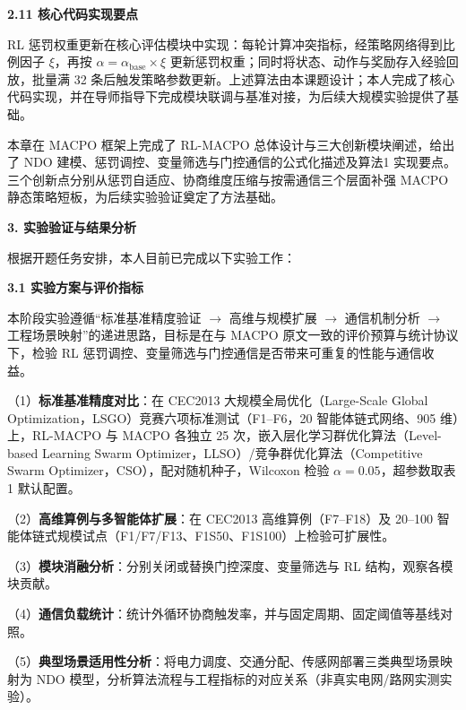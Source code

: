 \par
\indent
\textbf{2.11 核心代码实现要点}
\par
RL 惩罚权重更新在核心评估模块中实现：每轮计算冲突指标，经策略网络得到比例因子 $\xi$，再按 $\alpha=\alpha_{\mathrm{base}}\times\xi$ 更新惩罚权重；同时将状态、动作与奖励存入经验回放，批量满 32 条后触发策略参数更新。上述算法由本课题设计；本人完成了核心代码实现，并在导师指导下完成模块联调与基准对接，为后续大规模实验提供了基础。

\par

本章在 MACPO 框架上完成了 RL-MACPO 总体设计与三大创新模块阐述，给出了 NDO 建模、惩罚调控、变量筛选与门控通信的公式化描述及算法1 实现要点。三个创新点分别从惩罚自适应、协商维度压缩与按需通信三个层面补强 MACPO 静态策略短板，为后续实验验证奠定了方法基础。

\par
\indent
\noindent\textbf{3. 实验验证与结果分析}

\par
\indent
根据开题任务安排，本人目前已完成以下实验工作：

\par
\indent
\textbf{3.1 实验方案与评价指标}
\par
本阶段实验遵循“标准基准精度验证 $\rightarrow$ 高维与规模扩展 $\rightarrow$ 通信机制分析 $\rightarrow$ 工程场景映射”的递进思路，目标是在与 MACPO 原文一致的评价预算与统计协议下，检验 RL 惩罚调控、变量筛选与门控通信是否带来可重复的性能与通信收益。

\par
\indent
（1）\textbf{标准基准精度对比}：在 CEC2013 大规模全局优化（Large-Scale Global Optimization，LSGO）竞赛六项标准测试（F1--F6，20 智能体链式网络、905 维）上，RL-MACPO 与 MACPO 各独立 25 次，嵌入层化学习群优化算法（Level-based Learning Swarm Optimizer，LLSO）/竞争群优化算法（Competitive Swarm Optimizer，CSO），配对随机种子，Wilcoxon 检验 $\alpha{=}0.05$，超参数取表1 默认配置。
\par
（2）\textbf{高维算例与多智能体扩展}：在 CEC2013 高维算例（F7--F18）及 20--100 智能体链式规模试点（F1/F7/F13、F1S50、F1S100）上检验可扩展性。
\par
（3）\textbf{模块消融分析}：分别关闭或替换门控深度、变量筛选与 RL 结构，观察各模块贡献。
\par
（4）\textbf{通信负载统计}：统计外循环协商触发率，并与固定周期、固定阈值等基线对照。
\par
（5）\textbf{典型场景适用性分析}：将电力调度、交通分配、传感网部署三类典型场景映射为 NDO 模型，分析算法流程与工程指标的对应关系（非真实电网/路网实测实验）。

